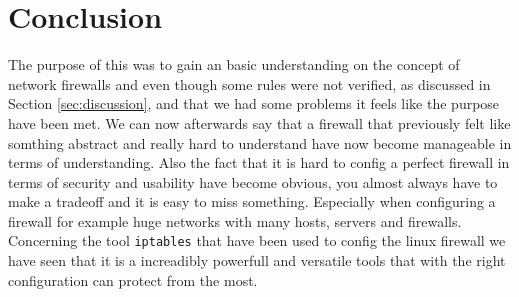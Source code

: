 \section{Conclusion} 
\label{sec:conclusion}
The purpose of this \lab{} was to gain an basic understanding on the concept of network firewalls and even though some rules were not verified, as discussed in Section \ref{sec:discussion}, and that we had some problems it feels like the purpose have been met. We can now afterwards say that a firewall that previously felt like somthing abstract and really hard to understand have now become manageable in terms of understanding. Also the fact that it is hard to config a perfect firewall in terms of security and usability have become obvious, you almost always have to make a tradeoff and it is easy to miss something. Especially when configuring a firewall for example huge networks with many hosts, servers and firewalls. Concerning the tool \texttt{iptables} that have been used to config the linux firewall we have seen that it is a increadibly powerfull and versatile tools that with the right configuration can protect from the most. 
